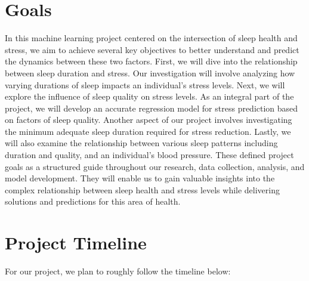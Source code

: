 \documentclass[11pt, letterpaper]{article}
\begin{document}
    \section*{Goals}
    In this machine learning project centered on the intersection of sleep health and stress, we aim to achieve several key objectives to better understand and predict the dynamics 
    between these two factors. First, we will dive into the relationship between sleep duration and stress. Our investigation will involve analyzing how varying durations of sleep 
    impacts an individual's stress levels. Next, we will explore the influence of sleep quality on stress levels. As an integral part of the project, we will develop an accurate 
    regression model for stress prediction based on factors of sleep quality. Another aspect of our project involves investigating the minimum adequate sleep duration required 
    for stress reduction. Lastly, we will also examine the relationship between various sleep patterns including duration and quality, and an individual's blood pressure. These 
    defined project goals as a structured guide throughout our research, data collection, analysis, and model development. They will enable us to gain valuable insights into the 
    complex relationship between sleep health and stress levels while delivering solutions and predictions for this area of health.

    \newpage

    \section*{Project Timeline}
    For our project, we plan to roughly follow the timeline below:
    
\end{document}

